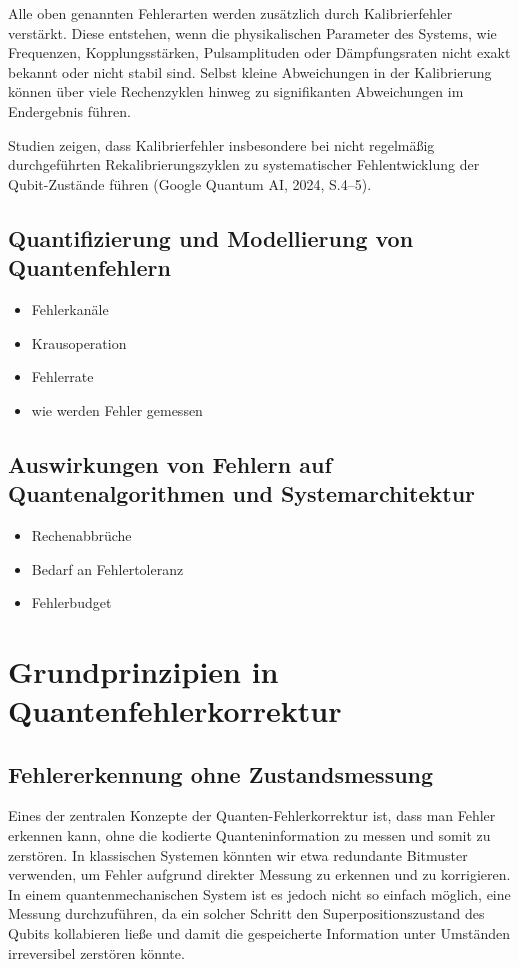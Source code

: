 Alle oben genannten Fehlerarten werden zusätzlich durch Kalibrierfehler verstärkt. Diese entstehen, wenn die physikalischen Parameter des Systems, wie Frequenzen, Kopplungsstärken, Pulsamplituden oder Dämpfungsraten nicht exakt bekannt oder nicht stabil sind. Selbst kleine Abweichungen in der Kalibrierung können über viele Rechenzyklen hinweg zu signifikanten Abweichungen im Endergebnis führen.

Studien zeigen, dass Kalibrierfehler insbesondere bei nicht regelmäßig durchgeführten Rekalibrierungszyklen zu systematischer Fehlentwicklung der Qubit-Zustände führen (Google Quantum AI, 2024, S.4–5).

\subsection{Quantifizierung und Modellierung von Quantenfehlern}
\begin{itemize}
\item Fehlerkanäle
\item Krausoperation
\item Fehlerrate
\item wie werden Fehler gemessen
\end{itemize}

\subsection{Auswirkungen von Fehlern auf Quantenalgorithmen und Systemarchitektur}
\begin{itemize}
\item Rechenabbrüche
\item Bedarf an Fehlertoleranz
\item Fehlerbudget
\end{itemize}


\section{Grundprinzipien in Quantenfehlerkorrektur}\label{chap:QEC2}
\subsection{Fehlererkennung ohne Zustandsmessung}
Eines der zentralen Konzepte der Quanten-Fehlerkorrektur ist, dass man Fehler erkennen kann, ohne die kodierte Quanteninformation zu messen und somit zu zerstören. In klassischen Systemen könnten wir etwa redundante Bitmuster verwenden, um Fehler aufgrund direkter Messung zu erkennen und zu korrigieren. In einem quantenmechanischen System ist es jedoch nicht so einfach möglich, eine Messung durchzuführen, da ein solcher Schritt den Superpositionszustand des Qubits kollabieren ließe und damit die gespeicherte Information unter Umständen irreversibel zerstören könnte. \cite{nielsen_michael_a_and_isaac_l_chuang_quantum_2010}

